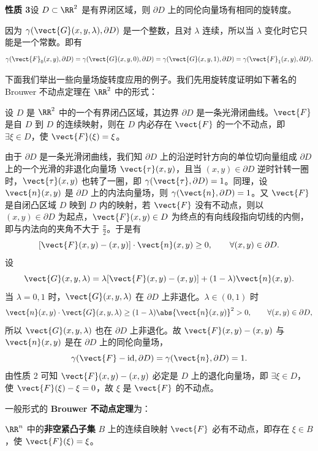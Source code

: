 \textbf{性质 3}\quad 设 $D\subset\RR^2$ 是有界闭区域，则 $\partial D$ 上的同伦向量场有相同的旋转度。

\begin{xproof}
因为 $\gamma(\vect{G}(x,y,\lambda),\partial D)$ 是一个整数，且对 $\lambda$ 连续，所以当 $\lambda$ 变化时它只能是一个常数。即有
\[
  \gamma(\vect{F}_0(x,y),\partial D)=\gamma(\vect{G}(x,y,0),\partial D)
  =\gamma(\vect{G}(x,y,1),\partial D)=\gamma(\vect{F}_1(x,y),\partial D).
\]
\end{xproof}

下面我们举出一些向量场旋转度应用的例子。我们先用旋转度证明如下著名的 Brouwer 不动点定理在 $\RR^2$ 中的形式：

\begin{xexample}[24.4.1]
设 $D$ 是 $\RR^2$ 中的一个有界闭凸区域，其边界 $\partial D$ 是一条光滑闭曲线。$\vect{F}$ 是自 $D$ 到 $D$ 的连续映射，则在 $D$ 内必存在 $\vect{F}$ 的一个不动点，即 $\exists\xi\in D$，使 $\vect{F}(\xi)=\xi$。
\end{xexample}
\begin{xproof}
由于 $\partial D$ 是一条光滑闭曲线，我们知 $\partial D$ 上的沿逆时针方向的单位切向量组成 $\partial D$ 上的一个光滑的非退化向量场 $\vect{\tau}(x,y)$，且当 $(x,y)\in\partial D$ 逆时针转一圈时，$\vect{\tau}(x,y)$ 也转了一圈，即 $\gamma(\vect{\tau},\partial D)=1$。同理，设 $\vect{n}(x,y)$ 是 $\partial D$ 上的内法向量场，则 $\gamma(\vect{n},\partial D)=1$。又 $\vect{F}$ 是自闭凸区域 $D$ 映到 $D$ 内的映射，若 $\vect{F}$ 没有不动点，则以 $(x,y)\in\partial D$ 为起点，$\vect{F}(x,y)\in D$ 为终点的有向线段指向切线的内侧，即与内法向的夹角不大于 $\frac\pi2$。于是有
\[
  [\vect{F}(x,y)-(x,y)]\cdot\vect{n}(x,y)\ge0,\qquad\forall(x,y)\in\partial D.
\]
设
\[
  \vect{G}(x,y,\lambda)=\lambda[\vect{F}(x,y)-(x,y)]+(1-\lambda)\vect{n}(x,y).
\]
当 $\lambda=0,1$ 时，$\vect{G}(x,y,\lambda)$ 在 $\partial D$ 上非退化。$\lambda\in(0,1)$ 时
\[
  \vect{n}(x,y)\cdot\vect{G}(x,y,\lambda)\ge(1-\lambda)\abs{\vect{n}(x,y)}^2>0,\qquad\forall(x,y)\in\partial D,
\]
所以 $\vect{G}(x,y,\lambda)$ 也在 $\partial D$ 上非退化。故 $\vect{F}(x,y)-(x,y)$ 与 $\vect{n}(x,y)$ 是在 $\partial D$ 上的同伦向量场，
\[
  \gamma(\vect{F}-\operatorname{id},\partial D)=\gamma(\vect{n},\partial D)=1.
\]
由性质 2 可知 $\vect{F}(x,y)-(x,y)$ 必定是 $D$ 上的退化向量场，即 $\exists\xi\in D$，使 $\vect{F}(\xi)-\xi=0$，故 $\xi$ 是 $\vect{F}$ 的不动点。
\end{xproof}

一般形式的 \textbf{Brouwer 不动点定理}为：

$\RR^n$ 中的\textbf{非空紧凸子集} $B$ 上的连续自映射 $\vect{F}$ 必有不动点，即存在 $\xi\in B$，使 $\vect{F}(\xi)=\xi$。

